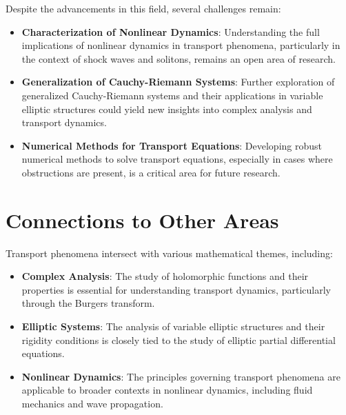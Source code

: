 \documentclass[11pt,a4paper]{article}
\begin{document}
Despite the advancements in this field, several challenges remain:

\begin{itemize}
\item \textbf{Characterization of Nonlinear Dynamics}: Understanding the full implications of nonlinear dynamics in transport phenomena, particularly in the context of shock waves and solitons, remains an open area of research.
\end{itemize}

\begin{itemize}
\item \textbf{Generalization of Cauchy-Riemann Systems}: Further exploration of generalized Cauchy-Riemann systems and their applications in variable elliptic structures could yield new insights into complex analysis and transport dynamics.
\end{itemize}

\begin{itemize}
\item \textbf{Numerical Methods for Transport Equations}: Developing robust numerical methods to solve transport equations, especially in cases where obstructions are present, is a critical area for future research.
\end{itemize}

\section{Connections to Other Areas}

Transport phenomena intersect with various mathematical themes, including:

\begin{itemize}
\item \textbf{Complex Analysis}: The study of holomorphic functions and their properties is essential for understanding transport dynamics, particularly through the Burgers transform.
\end{itemize}

\begin{itemize}
\item \textbf{Elliptic Systems}: The analysis of variable elliptic structures and their rigidity conditions is closely tied to the study of elliptic partial differential equations.
\end{itemize}

\begin{itemize}
\item \textbf{Nonlinear Dynamics}: The principles governing transport phenomena are applicable to broader contexts in nonlinear dynamics, including fluid mechanics and wave propagation.
\end{itemize}
\end{document}

